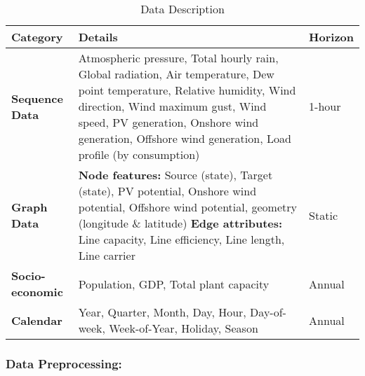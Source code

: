 \documentclass[sigconf,nonacm]{acmart}
\begin{document}
\begin{table}[h!]
  \caption{Data Description}
  \label{tab:data_description}
  \begin{tabular}{lp{4.3cm}l}
    \toprule
    \textbf{Category} & \textbf{Details} & \textbf{Horizon} \\
    \midrule
    \textbf{Sequence Data} & Atmospheric pressure, Total hourly rain, Global radiation, Air temperature, Dew point temperature, Relative humidity, Wind direction, Wind maximum gust, Wind speed, PV generation, Onshore wind generation, Offshore wind generation, Load profile (by consumption) & 1-hour \\
    \midrule
    \textbf{Graph Data} &
    \textbf{Node features:} Source (state), Target (state), PV potential, Onshore wind potential, Offshore wind potential, geometry (longitude \& latitude) \newline
    \textbf{Edge attributes:} Line capacity, Line efficiency, Line length, Line carrier & Static \\
    \midrule
    \textbf{Socio-economic} & Population, GDP, Total plant capacity & Annual \\
    \midrule
    \textbf{Calendar} & Year, Quarter, Month, Day, Hour, Day-of-week, Week-of-Year, Holiday, Season & Annual \\
    \bottomrule
  \end{tabular}
\end{table}


\subsubsection{\textbf{Data Preprocessing}:}
\end{document}
